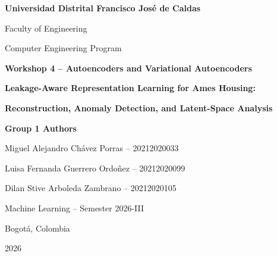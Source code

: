 \documentclass[11pt,letterpaper]{article}
\begin{document}
\hypersetup{pageanchor=false}
\begin{titlepage}
\centering
\vspace*{1.0cm}
{\Large\bfseries Universidad Distrital Francisco Jos\'e de Caldas\par}
\vspace{0.55cm}
{\large Faculty of Engineering\par}
{\large Computer Engineering Program\par}

\vfill
{\Large\bfseries Workshop 4 -- Autoencoders and Variational Autoencoders\par}
\vspace{0.8cm}
{\LARGE\bfseries Leakage-Aware Representation Learning for Ames Housing:\par}
\vspace{0.25cm}
{\LARGE\bfseries Reconstruction, Anomaly Detection, and Latent-Space Analysis\par}

\vfill
{\large\bfseries Group 1 Authors\par}
\vspace{0.5cm}
{\large Miguel Alejandro Ch\'avez Porras -- 20212020033\par}
{\large Luisa Fernanda Guerrero Ordo\~nez -- 20212020099\par}
{\large Dilan Stive Arboleda Zambrano -- 20212020105\par}

\vfill
{\large Machine Learning -- Semester 2026-III\par}
{\large Bogot\'a, Colombia\par}
\vspace{0.5cm}
{\large 2026\par}
\end{titlepage}

\hypersetup{pageanchor=true}
\tableofcontents
\clearpage
{}
\end{document}
